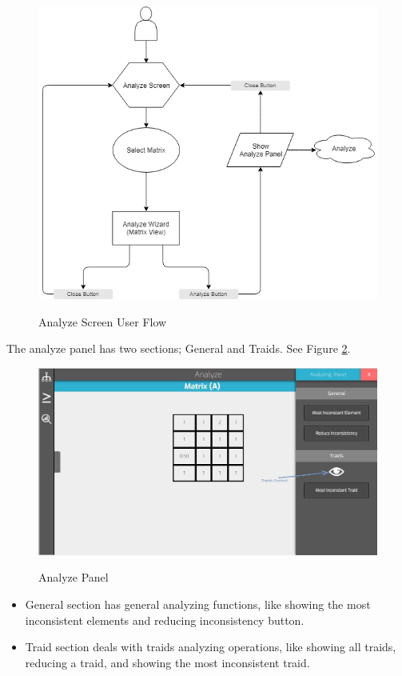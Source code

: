 \documentclass[11pt]{article} %
\begin{document}
\begin{figure}
  \caption{Analyze Screen User Flow}
  \centering
  \includegraphics[width=\textwidth]{analyzeUserFlow}
  \label{diagram:analyzeUserFlow}
\end{figure}

\noindent
The analyze panel has two sections; General and Traids. See Figure \ref{screenshot:analyze panel}.

\begin{figure}
  \caption{Analyze Panel}
  \centering
  \includegraphics[width=\textwidth]{analyzePanel}
  \label{screenshot:analyze panel}
\end{figure}

\begin{itemize}
\item General section has general analyzing functions, like showing the most inconsistent elements and reducing inconsistency button.
\item Traid section deals with traids analyzing operations, like showing all traids, reducing a traid, and showing the most inconsistent traid.
\end{itemize}
\end{document}
